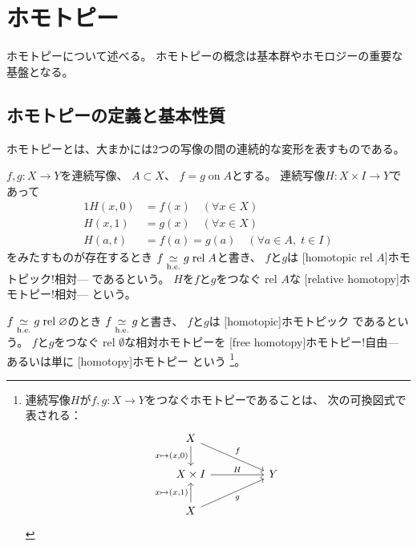 \documentclass[report]{jlreq}
\begin{document}
\section{ホモトピー}

ホモトピーについて述べる。
ホモトピーの概念は基本群やホモロジーの重要な基盤となる。

\subsection{ホモトピーの定義と基本性質}



ホモトピーとは、大まかには2つの写像の間の連続的な変形を表すものである。

\begin{definition}[相対ホモトピー]
    $f, g \colon X \to Y$を連続写像、
    $A \subset X$、
    $f = g \; \text{on} \; A$とする。
    連続写像$H \colon X \times I \to Y$であって
    \begin{alignat}{1}
        H(x, 0) &= f(x) \quad (\forall x \in X) \\
        H(x, 1) &= g(x) \quad (\forall x \in X) \\
        H(a, t) &= f(a) = g(a) \quad (\forall a \in A, \; t \in I)
    \end{alignat}
    をみたすものが存在するとき
    $f \simeqhe g \; \rel \; A$と書き、
    $f$と$g$は
    [homotopic rel $A$]{ホモトピック!相対---}
    であるという。
    $H$を$f$と$g$をつなぐ rel $A$な
    [relative homotopy]{ホモトピー!相対---}
    という。
\end{definition}

\begin{definition}[自由ホモトピー]
    $f \simeqhe g \; \rel \; \emptyset$のとき
    $f \simeqhe g$と書き、
    $f$と$g$は
    [homotopic]{ホモトピック}
    であるという。
    $f$と$g$をつなぐ rel $\emptyset$な相対ホモトピーを
    [free homotopy]{ホモトピー!自由---}
    あるいは単に
    [homotopy]{ホモトピー}
    という
    \footnote{
        連続写像$H$が$f, g \colon X \to Y$をつなぐホモトピーであることは、
        次の可換図式で表される：
        \begin{equation}
            \begin{tikzcd}[column sep=huge, ampersand replacement=\&]
                X \ar{d}[swap]{x \mapsto (x, 0)} \ar{dr}{f} \\
                X \times I \ar{r}{H} \& Y \\
                X \ar{u}{x \mapsto (x, 1)} \ar{ur}[swap]{g}
            \end{tikzcd}
        \end{equation}
    }。
\end{definition}
\end{document}

